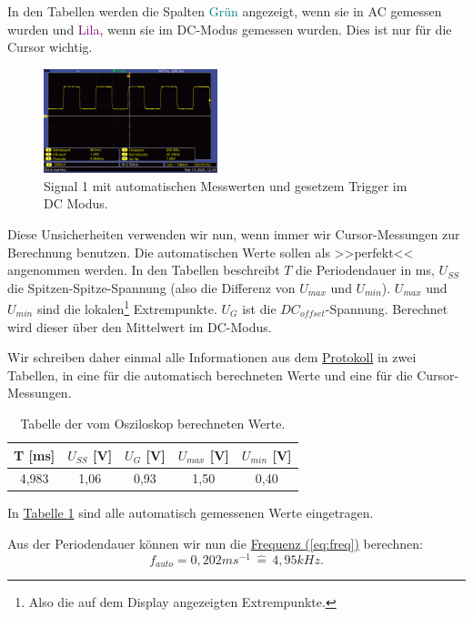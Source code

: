 In den Tabellen werden die Spalten \textcolor{teal}{Grün} angezeigt, wenn sie in AC gemessen wurden und \textcolor{purple}{Lila}, wenn sie im DC-Modus gemessen wurden. Dies ist nur für die Cursor wichtig.

\begin{figure} [h!]
    \centering
        \includegraphics[width=0.45\textwidth]{img/25/Signale2/Signal1-DC.pdf}
    \caption{Signal 1 mit automatischen Messwerten und gesetzem Trigger im DC Modus.}
\end{figure}

Diese Unsicherheiten verwenden wir nun, wenn immer wir Cursor-Messungen zur Berechnung benutzen. Die automatischen Werte sollen als >>perfekt<< angenommen werden.
In den Tabellen beschreibt $T$ die Periodendauer in ms, $U_{SS}$ die Spitzen-Spitze-Spannung (also die Differenz von $U_{max}$ und $U_{min}$). $U_{max}$ und $U_{min}$ sind die lokalen\footnote{Also die auf dem Display angezeigten Extrempunkte.} Extrempunkte. $U_{G}$ ist die $DC_{offset}$-Spannung. Berechnet wird dieser über den Mittelwert im DC-Modus.

Wir schreiben daher einmal alle Informationen aus dem  \hyperref[Protokoll]{Protokoll} in zwei Tabellen, in eine für die automatisch berechneten Werte und eine für die Cursor-Messungen.

\begin{table}[h!]
    \centering
    \begin{tabular}{c | c | c | c | c }
        \toprule
        T [ms] & $U_{SS}$ [V] & $U_{G}$ [V] & $U_{max}$ [V] & $U_{min}$ [V] \\
        \hline
        4,983 & 1,06 & 0,93 & 1,50 & 0,40 \\
        \bottomrule
    \end{tabular}
    \caption{Tabelle der vom Osziloskop berechneten Werte.}
    \label{tab:sig1_auto}
\end{table}

In \hyperref[tab:sig1_auto]{Tabelle \ref*{tab:sig1_auto}} sind alle automatisch gemessenen Werte eingetragen. 

Aus der Periodendauer können wir nun die \hyperref[eq:freq]{Frequenz (\ref*{eq:freq})} berechnen:
\begin{equation}
    \boxed{
        f_{auto} = 0,202 ms^{-1} \, \hat = \, 4,95 kHz
    }.
\end{equation}

